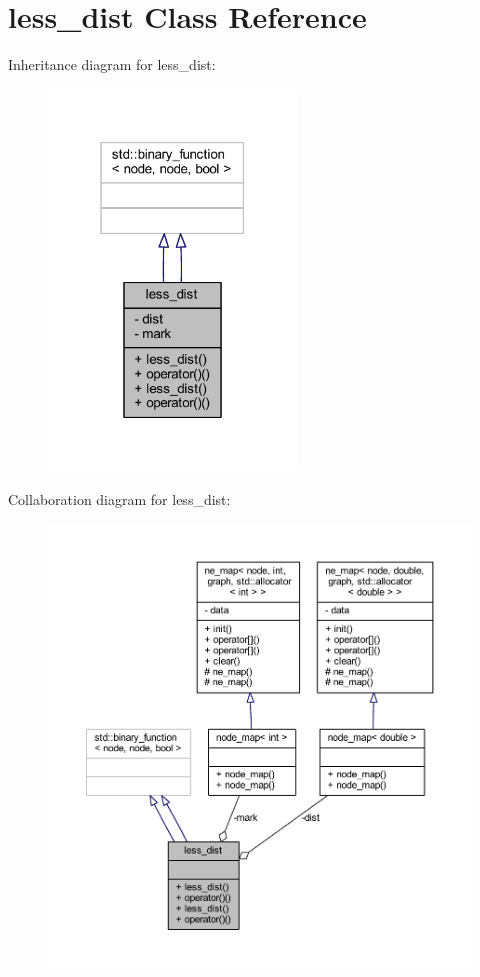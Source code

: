 \hypertarget{classless__dist}{}\section{less\+\_\+dist Class Reference}
\label{classless__dist}


Inheritance diagram for less\+\_\+dist\+:\nopagebreak
\begin{figure}[H]
\begin{center}
\leavevmode
\includegraphics[width=187pt]{classless__dist__inherit__graph}
\end{center}
\end{figure}


Collaboration diagram for less\+\_\+dist\+:\nopagebreak
\begin{figure}[H]
\begin{center}
\leavevmode
\includegraphics[width=350pt]{classless__dist__coll__graph}
\end{center}
\end{figure}
